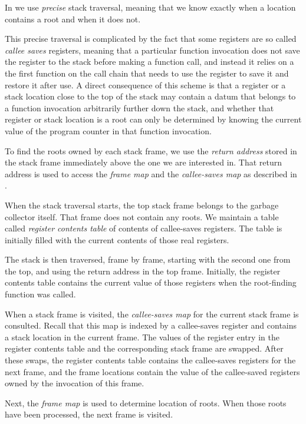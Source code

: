 In \sysname{} we use \emph{precise} stack traversal, meaning that we
know exactly when a location contains a root and when it does not.

This precise traversal is complicated by the fact that some registers
are so called \emph{callee saves} registers, meaning that a particular
function invocation does not save the register to the stack before
making a function call, and instead it relies on a the first function
on the call chain that needs to use the register to save it and
restore it after use.  A direct consequence of this scheme is that a
register or a stack location close to the top of the stack may contain
a datum that belongs to a function invocation arbitrarily further down
the stack, and whether that register or stack location is a root can
only be determined by knowing the current value of the program counter
in that function invocation.

To find the roots owned by each stack frame, we use the \emph{return
  address} stored in the stack frame immediately above the one we are
interested in.  That return address is used to access the \emph{frame
  map} and the \emph{callee-saves map} as described in
.

When the stack traversal starts, the top stack frame belongs to the
garbage collector itself.  That frame does not contain any roots.  We
maintain a table called \emph{register contents table} of contents of
callee-saves registers.  The table is initially filled with the
current contents of those real registers.

The stack is then traversed, frame by frame, starting with the second
one from the top, and using the return address in the top frame.
Initially, the register contents table contains the current value of
those registers when the root-finding function was called.

When a stack frame is visited, the \emph{callee-saves map} for the
current stack frame is consulted.  Recall that this map is indexed by
a callee-saves register and contains a stack location in the current
frame.  The values of the register entry in the register contents
table and the corresponding stack frame are swapped.  After these
swaps, the register contents table contains the callee-saves
registers for the next frame, and the frame locations contain the
value of the callee-saved registers owned by the invocation of this
frame.

Next, the \emph{frame map} is used to determine location of roots.
When those roots have been processed, the next frame is visited.

